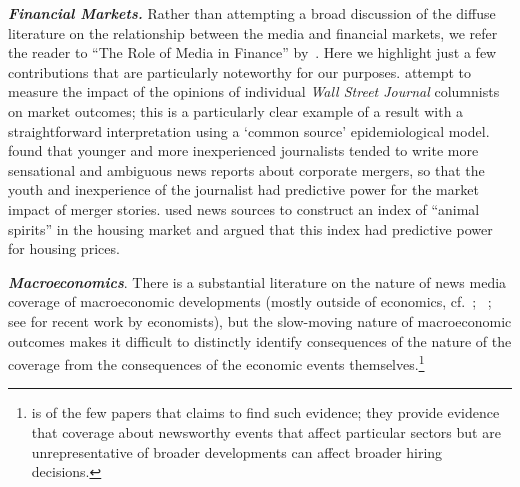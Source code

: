 \textbf{\textit{Financial Markets.}}  Rather than attempting a broad discussion of the diffuse literature on the relationship between the media and financial markets, we refer the reader to ``The Role of Media in Finance'' by~\cite{TETLOCK2015701}.  Here we highlight just a few contributions that are particularly noteworthy for our purposes. %
\href{https://www.researchgate.net/publication/227465410_Journalists_and_the_Stock_Market}{\cite{dougal2012journalists}} attempt to measure the impact of the opinions of individual \textit{Wall Street Journal} columnists on market outcomes; this is a particularly clear example of a result with a straightforward interpretation using a `common source' epidemiological model.  \href{https://www.public.asu.edu/~dsosyura/ResearchPapers/Rumor\%20Has\%20It\%20--\%20Sensationalism\%20in\%20Financial\%20Media.pdf}{\cite{ahern2015rumor}} found that younger and more inexperienced journalists tended to write more sensational and ambiguous news reports about corporate mergers, so that the youth and inexperience of the journalist had predictive power for the market impact of merger stories. %
\href{https://www.stern.nyu.edu/sites/default/files/assets/documents/con_040497.pdf}{\cite{soo_quantifying_2015}} used news sources to construct an index of ``animal spirits'' in the housing market and argued that this index had predictive power for housing prices.

\textbf{\textit{Macroeconomics}}.  There is a substantial literature on the nature of news media coverage of macroeconomic developments (mostly outside of economics, cf.~\cite{soroka2015s}; ~\cite{damstra2021economy}; see  \cite{bybee2020structure} for recent work by economists), but the slow-moving nature of macroeconomic outcomes makes it difficult to distinctly identify consequences of the nature of the coverage from the consequences of the economic events themselves.\footnote{\cite{chahrour2021sectoral} is of the few papers that claims to find such evidence; they provide evidence that coverage about newsworthy events that affect particular sectors but are unrepresentative of broader developments can affect broader hiring decisions.}

